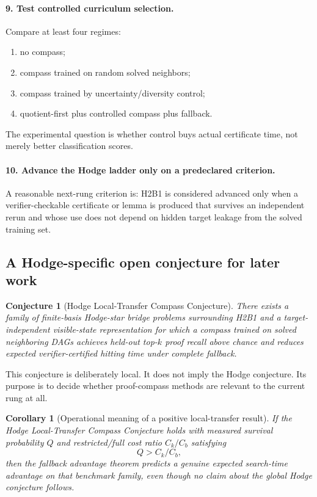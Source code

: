 \documentclass[11pt]{article}
\newtheorem{corollary}[theorem]{Corollary}
\newtheorem{conjecture}[theorem]{Conjecture}
\begin{document}
\paragraph{9. Test controlled curriculum selection.}
Compare at least four regimes:
\begin{enumerate}
\item no compass;
\item compass trained on random solved neighbors;
\item compass trained by uncertainty/diversity control;
\item quotient-first plus controlled compass plus fallback.
\end{enumerate}
The experimental question is whether control buys actual certificate time, not merely better classification scores.

\paragraph{10. Advance the Hodge ladder only on a predeclared criterion.}
A reasonable next-rung criterion is: H2B1 is considered advanced only when a verifier-checkable certificate or lemma is produced that survives an independent rerun and whose use does not depend on hidden target leakage from the solved training set.

\subsection{A Hodge-specific open conjecture for later work}

\begin{conjecture}[Hodge Local-Transfer Compass Conjecture]
There exists a family of finite-basis Hodge-star bridge problems surrounding H2B1 and a target-independent visible-state representation for which a compass trained on solved neighboring DAGs achieves held-out top-\(k\) proof recall above chance and reduces expected verifier-certified hitting time under complete fallback.
\end{conjecture}

This conjecture is deliberately local. It does not imply the Hodge conjecture. Its purpose is to decide whether proof-compass methods are relevant to the current rung at all.

\begin{corollary}[Operational meaning of a positive local-transfer result]
If the Hodge Local-Transfer Compass Conjecture holds with measured survival probability \(Q\) and restricted/full cost ratio \(C_k/C_b\) satisfying
\[
Q>C_k/C_b,
\]
then the fallback advantage theorem predicts a genuine expected search-time advantage on that benchmark family, even though no claim about the global Hodge conjecture follows.
\end{corollary}
\end{document}
